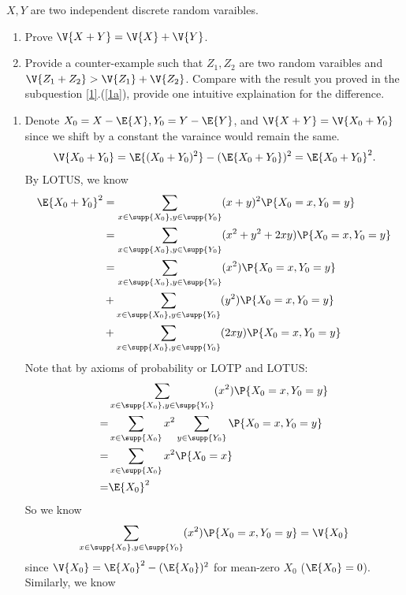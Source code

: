 \begin{exercise}
	\label{1}$X,Y$ are two independent discrete random varaibles.	
	\begin{enumerate}
		\item \label{1a}Prove $\V{X+Y}=\V{X}+\V{Y}$.
		\item Provide a counter-example such that $Z_1,Z_2$ are two random varaibles and  $\V{Z_1+Z_2}>\V{Z_1}+\V{Z_2}$. Compare with the result you proved in the subquestion \ref{1}.(\ref{1a}), provide one intuitive explaination for the difference. 
	\end{enumerate}
\begin{solution}
	\begin{enumerate}
		\item Denote $X_0=X-\E{X}, Y_0=Y-\E{Y}$, and  $\V{X+Y}=\V{X_0+Y_0}$ since we shift by a constant the varaince would remain the same. 
		\begin{align*}
			\V{X_0+Y_0}= \E{(X_0+Y_0)^2}- (\E{X_0+Y_0})^2 = \E{X_0+Y_0}^2.
		\end{align*}
		By LOTUS, we know 
		\begin{align}
			\E{X_0+Y_0}^2& =\sum_{x\in \supp{X_0},y\in \supp{Y_0}} (x+y)^2 \P{X_0=x,Y_0=y}\nonumber\\
			&= \sum_{x\in \supp{X_0},y\in \supp{Y_0}} (x^2+y^2+2xy) \P{X_0=x,Y_0=y}\nonumber \\
			&= \sum_{x\in \supp{X_0},y\in \supp{Y_0}} (x^2 ) \P{X_0=x,Y_0=y}\nonumber\\&+\sum_{x\in \supp{X_0},y\in \supp{Y_0}} ( y^2 ) \P{X_0=x,Y_0=y}\nonumber\\&+\sum_{x\in \supp{X_0},y\in \supp{Y_0}} ( 2xy) \P{X_0=x,Y_0=y}   \label{11}
		\end{align}
		Note that by axioms of probability or LOTP and LOTUS:
		\begin{align*}
			& \sum_{x\in \supp{X_0},y\in \supp{Y_0}} (x^2 ) \P{X_0=x,Y_0=y} \\
			=& \sum_{x\in \supp{X_0} } x^2 \sum_{ y\in \supp{Y_0}}   \P{X_0=x,Y_0=y}\\
			= &  \sum_{x\in \supp{X_0} } x^2   \P{X_0=x}\\
			=& \E{X_0}^2
		\end{align*} 
		So we know 
		\begin{align}
			\sum_{x\in \supp{X_0},y\in \supp{Y_0}} (x^2 ) \P{X_0=x,Y_0=y}=\V{X_0} \label{12}
		\end{align}
		since $\V{X_0}=\E{X_0}^2-(\E{X_0})^2$ for mean-zero $X_0$ ($\E{X_0}=0$).
		Similarly,  we know 
		\begin{align}

\end{align}
\end{enumerate}
\end{solution}
\end{exercise}
